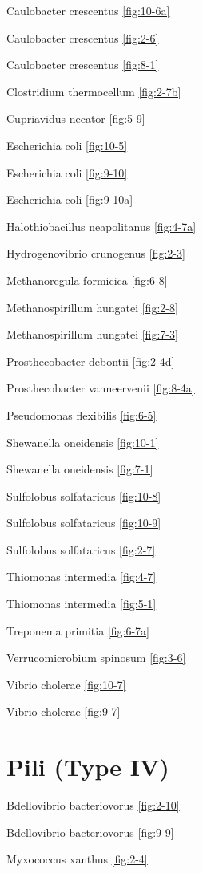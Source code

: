 \documentclass[]{tufte-book}
\begin{document}
Caulobacter crescentus \ref{fig:10-6a}

Caulobacter crescentus \ref{fig:2-6}

Caulobacter crescentus \ref{fig:8-1}

Clostridium thermocellum \ref{fig:2-7b}

Cupriavidus necator \ref{fig:5-9}

Escherichia coli \ref{fig:10-5}

Escherichia coli \ref{fig:9-10}

Escherichia coli \ref{fig:9-10a}

Halothiobacillus neapolitanus \ref{fig:4-7a}

Hydrogenovibrio crunogenus \ref{fig:2-3}

Methanoregula formicica \ref{fig:6-8}

Methanospirillum hungatei \ref{fig:2-8}

Methanospirillum hungatei \ref{fig:7-3}

Prosthecobacter debontii \ref{fig:2-4d}

Prosthecobacter vanneervenii \ref{fig:8-4a}

Pseudomonas flexibilis \ref{fig:6-5}

Shewanella oneidensis \ref{fig:10-1}

Shewanella oneidensis \ref{fig:7-1}

Sulfolobus solfataricus \ref{fig:10-8}

Sulfolobus solfataricus \ref{fig:10-9}

Sulfolobus solfataricus \ref{fig:2-7}

Thiomonas intermedia \ref{fig:4-7}

Thiomonas intermedia \ref{fig:5-1}

Treponema primitia \ref{fig:6-7a}

Verrucomicrobium spinosum \ref{fig:3-6}

Vibrio cholerae \ref{fig:10-7}

Vibrio cholerae \ref{fig:9-7}

\hypertarget{pili-type-iv}{%
\section*{Pili (Type IV)}\label{pili-type-iv}}

Bdellovibrio bacteriovorus \ref{fig:2-10}

Bdellovibrio bacteriovorus \ref{fig:9-9}

Myxococcus xanthus \ref{fig:2-4}
\end{document}
